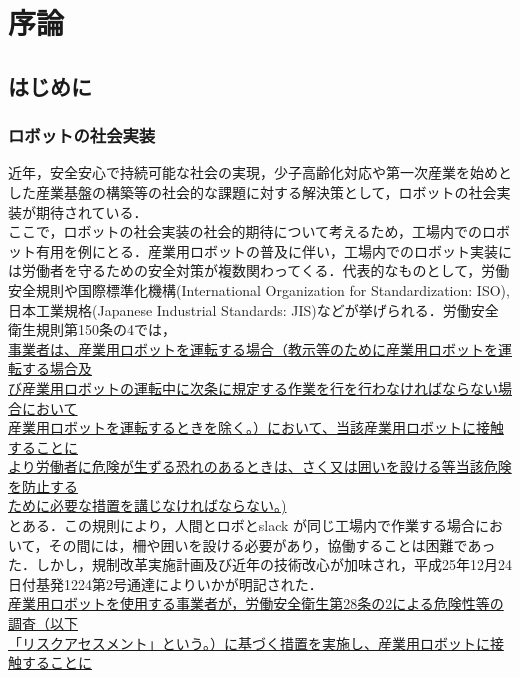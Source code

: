 \chapter{序論}
\section{はじめに}%
\subsection{ロボットの社会実装}
近年，安全安心で持続可能な社会の実現，少子高齢化対応や第一次産業を始めとした産業基盤の構築等の社会的な課題に対する解決策として，ロボットの社会実装が期待されている．\\
ここで，ロボットの社会実装の社会的期待について考えるため，工場内でのロボット有用を例にとる．産業用ロボットの普及に伴い，工場内でのロボット実装には労働者を守るための安全対策が複数関わってくる．代表的なものとして，労働安全規則や国際標準化機構(International Organization for Standardization: ISO), 日本工業規格(Japanese Industrial Standards: JIS)などが挙げられる．労働安全衛生規則第150条の4では，\\
 \underline{事業者は、産業用ロボットを運転する場合（教示等のために産業用ロボットを運転する場合及}\\
 \underline{び産業用ロボットの運転中に次条に規定する作業を行を行わなければならない場合において}\\
 \underline{産業用ロボットを運転するときを除く。）において、当該産業用ロボットに接触することに}\\
 \underline{より労働者に危険が生ずる恐れのあるときは、さく又は囲いを設ける等当該危険を防止する}\\
 \underline{ために必要な措置を講じなければならない。)}\\
  とある．この規則により，人間とロボとslack が同じ工場内で作業する場合において，その間には，柵や囲いを設ける必要があり，協働することは困難であった．しかし，規制改革実施計画及び近年の技術改心が加味され，平成25年12月24日付基発1224第2号通達によりいかが明記された．\\
 \underline{産業用ロボットを使用する事業者が，労働安全衛生第28条の2による危険性等の調査（以下}\\
 \underline{「リスクアセスメント」という。）に基づく措置を実施し、産業用ロボットに接触することに}\\
